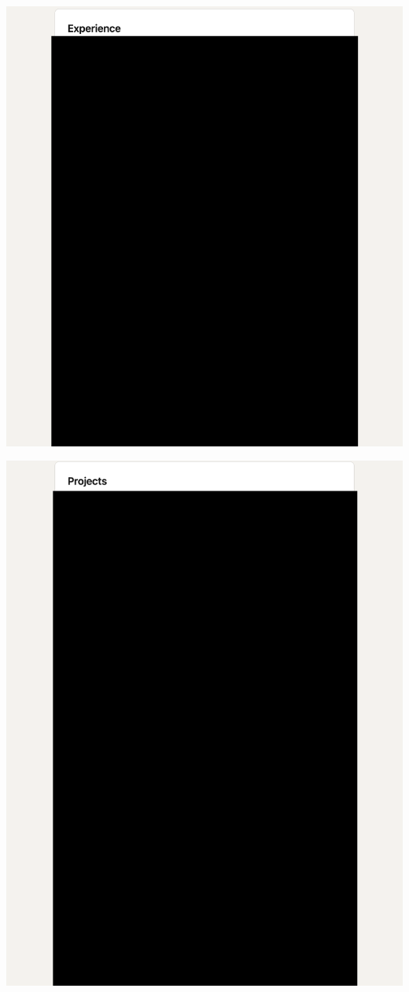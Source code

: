 \Continuing
\begin{center}
    \includegraphics[width=40em]{ieee-reference-one-linkedin-p2_public}
\end{center}
\WillContinue
\pagebreak

\Continuing
\begin{center}
    \includegraphics[width=40em]{ieee-reference-one-linkedin-p3_public}
\end{center}

\pagebreak
